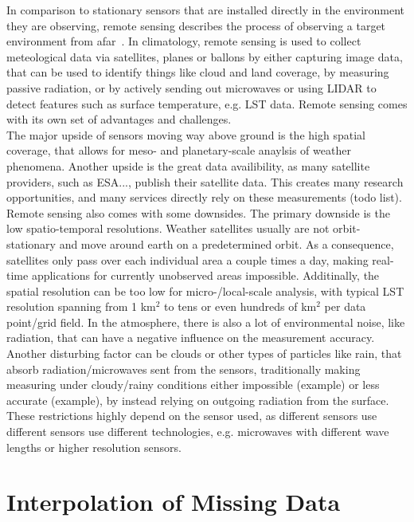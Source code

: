 In comparison to stationary sensors that are installed directly in the environment they are observing, remote sensing describes the process of observing a target environment from afar~\cite{campbell2011introduction}. In climatology, remote sensing is used to collect meteological data via satellites, planes or ballons by either capturing image data, that can be used to identify things like cloud and land coverage, by measuring passive radiation, or by actively sending out microwaves or using LIDAR to detect features such as surface temperature, e.g. LST data. Remote sensing comes with its own set of advantages and challenges.\\
The major upside of sensors moving way above ground is the high spatial coverage, that allows for meso- and planetary-scale anaylsis of weather phenomena. Another upside is the great data availibility, as many satellite providers, such as ESA..., publish their satellite data. This creates many research opportunities, and many services directly rely on these measurements (todo list).\\ %
Remote sensing also comes with some downsides. The primary downside is the low spatio-temporal resolutions. Weather satellites usually are not orbit-stationary and move around earth on a predetermined orbit. As a consequence, satellites only pass over each individual area a couple times a day, making real-time applications for currently unobserved areas impossible. Additinally, the spatial resolution can be too low for micro-/local-scale analysis, with typical LST resolution spanning from 1 km$^{2}$ to tens or even hundreds of km$^{2}$ per data point/grid field. In the atmosphere, there is also a lot of environmental noise, like radiation, that can have a negative influence on the measurement accuracy. Another disturbing factor can be clouds or other types of particles like rain, that absorb radiation/microwaves sent from the sensors, traditionally making measuring under cloudy/rainy conditions either impossible (example) or less accurate (example), by instead relying on outgoing radiation from the surface. These restrictions highly depend on the sensor used, as different sensors use different 
sensors use different technologies, e.g. microwaves with different wave lengths or higher resolution sensors.




\section{Interpolation of Missing Data}

